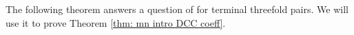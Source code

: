 \documentclass[11pt]{amsart}
\numberwithin{equation}{section}
\newcommand{\mld}{{\rm{mld}}}
\newcommand{\Ii}{{\Gamma}}
\newtheorem{conj}[thm]{Conjecture}
\theoremstyle{definition}
\theoremstyle{definition}
\begin{document}

The following theorem answers a question of \cite[Conjecture 7.2]{HL20} for terminal threefold pairs. We will use it to prove Theorem \ref{thm: mn intro DCC coeff}.
\end{document}
